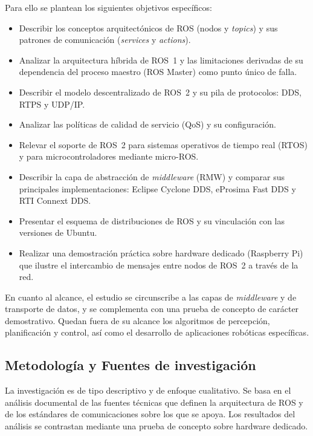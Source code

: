 Para ello se plantean los siguientes objetivos específicos:
\begin{itemize}
    \item Describir los conceptos arquitectónicos de ROS (nodos y \textit{topics})
    y sus patrones de comunicación (\textit{services} y \textit{actions}).
    \item Analizar la arquitectura híbrida de ROS~1 y las limitaciones derivadas
    de su dependencia del proceso maestro (ROS Master) como punto único de
    falla.
    \item Describir el modelo descentralizado de ROS~2 y su pila de
    protocolos: DDS, RTPS y UDP/IP.
    \item Analizar las políticas de calidad de servicio (QoS) y su
    configuración.
    \item Relevar el soporte de ROS~2 para sistemas operativos de tiempo real
    (RTOS) y para microcontroladores mediante micro-ROS.
    \item Describir la capa de abstracción de \textit{middleware} (RMW) y
    comparar sus principales implementaciones: Eclipse Cyclone DDS, eProsima
    Fast DDS y RTI Connext DDS.
    \item Presentar el esquema de distribuciones de ROS y su vinculación con
    las versiones de Ubuntu.
    \item Realizar una demostración práctica sobre hardware dedicado (Raspberry
    Pi) que ilustre el intercambio de mensajes entre nodos de ROS~2 a través de
    la red.
\end{itemize}

En cuanto al alcance, el estudio se circunscribe a las capas de
\textit{middleware} y de transporte de datos, y se complementa con una prueba
de concepto de carácter demostrativo. Quedan fuera de su alcance los algoritmos
de percepción, planificación y control, así como el desarrollo de aplicaciones
robóticas específicas.

\subsection{Metodología y Fuentes de investigación}
La investigación es de tipo descriptivo y de enfoque cualitativo. Se basa en
el análisis documental de las fuentes técnicas que definen la arquitectura de
ROS y de los estándares de comunicaciones sobre los que se apoya. Los
resultados del análisis se contrastan mediante una prueba de concepto sobre
hardware dedicado.

